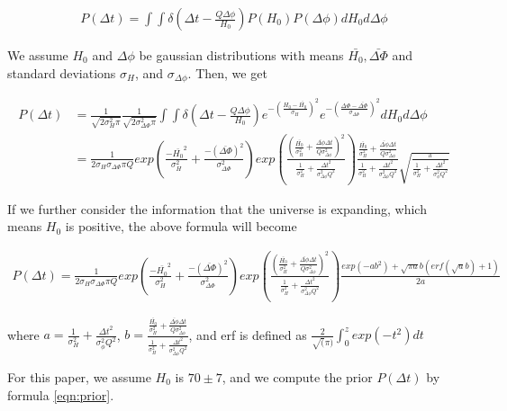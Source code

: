 \documentclass[\docopts]{\docclass}
\begin{document}
\begin{align}
P(\Delta t) = \int\int \delta(\Delta t - \frac{Q \Delta \phi }{H_0}) P(H_0)P(\Delta \phi) dH_0 d\Delta \phi
\end{align}

We assume $H_0$ and $\Delta \phi$ be gaussian distributions with means $\bar{H_0}, \bar{\Delta \Phi}$ and standard deviations $\sigma_{H}$, and $\sigma_{\Delta \phi}$. Then, we get

\begin{align}
P(\Delta t) &= \frac{1}{\sqrt{2\sigma_{H}^2\pi}}\frac{1}{\sqrt{2\sigma_{\Delta \Phi}^2\pi}}\int\int \delta(\Delta t - \frac{Q \Delta \phi}{H_0}) e^{-(\frac{H_0-\bar{H_0}}{\sigma_{H}})^2} e^{-(\frac{\Delta \Phi-\bar{\Delta \Phi}}{\sigma_{\Delta \Phi}})^2} dH_0 d\Delta \phi \\
&= \frac{1}{2\sigma_{H}\sigma_{\Delta \Phi}\pi Q} exp(\frac{-\bar{H_0}^2}{\sigma_H^2}+\frac{-(\bar{\Delta \Phi})^2}{\sigma_{\Delta \Phi}^2})
exp(\frac{(\frac{\bar{H_0}}{\sigma_H^2}+\frac{\bar{\Delta \phi}\Delta t}{Q\sigma_{\Delta \phi}^2})^2}{\frac{1}{\sigma_H^2}+\frac{\Delta t^2}{\sigma_{\Delta \phi}^2 Q^2}}) \frac{\frac{\bar{H_0}}{\sigma_H^2}+\frac{\bar{\Delta \phi}\Delta t}{Q\sigma_{\Delta \phi}^2}}{\frac{1}{\sigma_H^2}+\frac{\Delta t^2}{\sigma_{\Delta\phi}^2 Q^2}}
\sqrt{\frac{\pi}{\frac{1}{\sigma_H^2}+\frac{\Delta t^2}{\sigma_\phi^2Q^2}}}
\end{align}

If we further consider the information that the universe is expanding, which means $H_0$ is positive, the above formula will become

\begin{align}
\label{eqn:prior}
P(\Delta t) = \frac{1}{2\sigma_{H}\sigma_{\Delta \Phi}\pi Q} exp(\frac{-\bar{H_0}^2}{\sigma_H^2}+\frac{-(\bar{\Delta \Phi})^2}{\sigma_{\Delta \Phi}^2})
exp(\frac{(\frac{\bar{H_0}}{\sigma_H^2}+\frac{\bar{\Delta \phi}\Delta t}{Q\sigma_{\Delta \phi}^2})^2}{\frac{1}{\sigma_H^2}+\frac{\Delta t^2}{\sigma_{\Delta \phi}^2 Q^2}}) \frac{exp(-ab^2)+\sqrt{\pi a}b(erf(\sqrt{a}b)+1)}{2a}
\end{align}

 where $a=\frac{1}{\sigma_H^2}+\frac{\Delta t^2}{\sigma_\phi^2Q^2}$, $b=\frac{\frac{\bar{H_0}}{\sigma_H^2}+\frac{\bar{\Delta \phi}\Delta t}{Q\sigma_{\Delta \phi}^2}}{\frac{1}{\sigma_H^2}+\frac{\Delta t^2}{\sigma_{\Delta\phi}^2 Q^2}}$, and erf is defined as $\frac{2}{\sqrt(\pi)}\int_0^z exp(-t^2) dt$

For this paper, we assume $H_0$ is $70 \pm 7$, and we compute the prior $P(\Delta t)$ by formula \ref{eqn:prior}.
\end{document}
